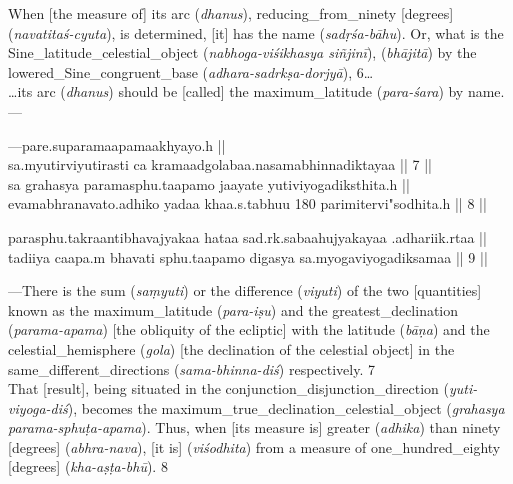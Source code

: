 \noindent\reversemarginpar{}%
When [the measure of] its \gls{arc} (\textit{dhanus}), \gls{reducing_from_ninety} [degrees] (\textit{navatitaś-cyuta}), is determined, [it] has the name  (\textit{sadṛśa-bāhu}). Or, what is the \gls{Sine_latitude_celestial_object} (\textit{nabhoga-viśikhasya siñjinī}),  (\textit{bhājitā}) by the \gls{lowered_Sine_congruent_base} (\textit{adhara-sadrkṣa-dorjyā}), 6\dots\\ \dots its \gls{arc} (\textit{dhanus}) should be [called] the \gls{maximum_latitude} (\textit{para-śara}) by name.---

\clearpage{}

{\hindifont\selectfont
\OnehalfSpacing
\large
{}%
---pare.suparamaapamaakhyayo.h ||\\
sa.myutirviyutirasti ca kramaadgolabaa.nasamabhinnadiktayaa || 7 ||
\\
sa grahasya paramasphu.taapamo jaayate yutiviyogadiksthita.h ||\\
evamabhranavato.adhiko yadaa khaa.s.tabhuu 180 parimitervi"sodhita.h || 8 || 
\medskip

%
parasphu.takraantibhavajyakaa hataa  sad.rk.sabaahujyakayaa .adhariik.rtaa ||  \\
tadiiya caapa.m bhavati sphu.taapamo digasya sa.myogaviyogadiksamaa || 9 ||
% 
}

\clearpage{}

\noindent\reversemarginpar{}%
---There is the \gls{sum} (\textit{saṃyuti}) or the \gls{difference} (\textit{viyuti}) of the two [quantities] known as the \gls{maximum_latitude} (\textit{para-iṣu}) and the \gls{greatest_declination} (\textit{parama-apama}) [\ie the obliquity of the ecliptic] with the  \gls{latitude} (\textit{bāṇa}) and the \gls{celestial_hemisphere} (\textit{gola}) [\ie the declination of the celestial object] in the \gls{same_different_directions} (\textit{sama-bhinna-diś}) respectively. 7\\ That [result], being situated in the \gls{conjunction_disjunction_direction} (\textit{yuti-viyoga-diś}), becomes the \gls{maximum_true_declination_celestial_object} (\textit{grahasya parama-sphuṭa-apama}). Thus, when [its measure is] \gls{greater} (\textit{adhika}) than \gls{ninety} [degrees] (\textit{abhra-nava}), [it is]  (\textit{viśodhita}) from a measure of \gls{one_hundred_eighty} [degrees] (\textit{kha-aṣṭa-bhū}). 8 \medskip

